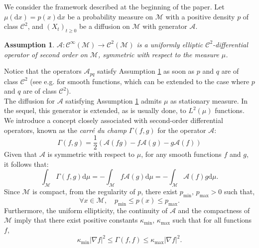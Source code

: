 \documentclass[10pt,a4paper]{article}
\newcommand\cA{\mathcal{A}}
\newcommand\cC{\mathcal{C}}
\newcommand\cM{\mathcal{M}}
\newcommand\dd{\mathrm{d}}
\newtheorem{assump}[theorem]{Assumption}
\begin{document}
We consider the framework described at the beginning of the paper. 
 Let $ \mu(\dd x)=p(x)\dd x$ be a probability measure on $\cM$ with a positive density $p$ of class $\cC^2$,  and $(X_t)_{t\ge 0}$ be  a diffusion on $\cM$ with generator $\cA$.
\begin{assump}\label{assump:A} 
$\cA: \cC^\infty(\cM) \rightarrow \cC^2(\cM)$ is a
uniformly elliptic $\mathcal{C}^2$-differential operator of second order on $\cM$, symmetric with respect to the measure $\mu$. \end{assump}

Notice that the operators $\cA_{pq}$ satisfy Assumption \ref{assump:A} as soon as $p$ and $q$ are of class $\cC^2$ (see e.g. \cite[Exercise 3.11, p. 69]{Grigoryan2009} for smooth functions, which can be extended to the case where $p$ and $q$ are of class $\cC^2$). \\
The diffusion for $\cA$ satisfying  Assumption \ref{assump:A} admits $\mu$ as stationary measure. In the sequel, this generator is extended, as is usually done, to $L^2(\mu)$ functions. 
We introduce a concept closely associated with second-order differential operators, known as the \textit{carré du champ} $\Gamma(f,g)$ for the operator $\mathcal{A}$: 
\begin{equation}\label{eq:carre-du-champ}
\Gamma(f,g) = \frac{1}{2}\left( \mathcal{A}(fg) - f\mathcal{A}(g) - g\mathcal{A}(f) \right)
\end{equation}
Given that $\mathcal{A}$ is symmetric with respect to $\mu$, for any smooth functions $f$ and $g$, it follows that:
\begin{equation}\label{eq:green-formula-generalA}
\int_\cM \Gamma(f,g) \mathrm{d}\mu = - \int_\cM f\mathcal{A}(g) \mathrm{d}\mu =-\int_\cM \mathcal{A}(f)g \mathrm{d}\mu.
\end{equation}
Since $\cM$ is compact, from the regularity of $p$, there exist $p_{\min}, \, p_{\max}>0$ such that, 
\begin{equation} \label{eq:pmin-pmax}
\forall x\in\cM,\quad p_{\min}\le p(x)\le p_{\max}.  
\end{equation}
Furthermore, the uniform ellipticity, the continuity of $\mathcal{A}$ and the compactness of $\mathcal{M}$ imply that 
there exist positive constants $\kappa_{\min}$, $\kappa_{\max}$ such that for all functions $f$,
\begin{equation}\label{eq:A-def-kappa}
\kappa_{\min}|\nabla f|^2 \le \Gamma(f,f) \le \kappa_{\max} |\nabla f|^2.
\end{equation}
\end{document}
